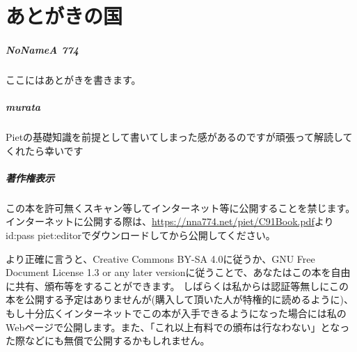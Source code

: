 \chapter[あとがきの国]{あとがきの国}

\paragraph{NoNameA 774}

ここにはあとがきを書きます。

\paragraph{murata}

Pietの基礎知識を前提として書いてしまった感があるのですが頑張って解読してくれたら幸いです

\paragraph{著作権表示}

{\small この本を許可無くスキャン等してインターネット等に公開することを禁じます。
インターネットに公開する際は、\url{https://nna774.net/piet/C91Book.pdf}よりid:pass piet:editorでダウンロードしてから公開してください。}

{\footnotesize より正確に言うと、Creative Commons BY-SA 4.0に従うか、GNU Free Document License 1.3 or any later versionに従うことで、あなたはこの本を自由に共有、頒布等をすることができます。
しばらくは私からは認証等無しにこの本を公開する予定はありませんが(購入して頂いた人が特権的に読めるように)、もし十分広くインターネットでこの本が入手できるようになった場合には私のWebページで公開します。また、「これ以上有料での頒布は行なわない」となった際などにも無償で公開するかもしれません。}
